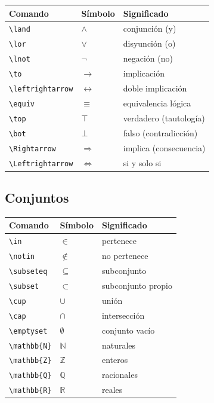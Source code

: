 \begin{center}
\begin{tabular}{lll}
\toprule
\textbf{Comando} & \textbf{Símbolo} & \textbf{Significado} \\
\midrule
\texttt{\textbackslash{}land}  & $\land$ & conjunción (y) \\
\texttt{\textbackslash{}lor}   & $\lor$  & disyunción (o) \\
\texttt{\textbackslash{}lnot}  & $\lnot$ & negación (no) \\
\texttt{\textbackslash{}to}    & $\to$   & implicación \\
\texttt{\textbackslash{}leftrightarrow} & $\leftrightarrow$ & doble implicación \\
\texttt{\textbackslash{}equiv} & $\equiv$ & equivalencia lógica \\
\texttt{\textbackslash{}top}   & $\top$   & verdadero (tautología) \\
\texttt{\textbackslash{}bot}   & $\bot$   & falso (contradicción) \\
\texttt{\textbackslash{}Rightarrow}  & $\Rightarrow$ & implica (consecuencia) \\
\texttt{\textbackslash{}Leftrightarrow} & $\Leftrightarrow$ & si y solo si \\
\bottomrule
\end{tabular}
\end{center}

\subsection{Conjuntos}

\begin{center}
\begin{tabular}{lll}
\toprule
\textbf{Comando} & \textbf{Símbolo} & \textbf{Significado} \\
\midrule
\texttt{\textbackslash{}in}     & $\in$   & pertenece \\
\texttt{\textbackslash{}notin}  & $\notin$ & no pertenece \\
\texttt{\textbackslash{}subseteq} & $\subseteq$ & subconjunto \\
\texttt{\textbackslash{}subset} & $\subset$ & subconjunto propio \\
\texttt{\textbackslash{}cup}    & $\cup$  & unión \\
\texttt{\textbackslash{}cap}    & $\cap$  & intersección \\
\texttt{\textbackslash{}emptyset} & $\emptyset$ & conjunto vacío \\
\texttt{\textbackslash{}mathbb\{N\}} & $\mathbb{N}$ & naturales \\
\texttt{\textbackslash{}mathbb\{Z\}} & $\mathbb{Z}$ & enteros \\
\texttt{\textbackslash{}mathbb\{Q\}} & $\mathbb{Q}$ & racionales \\
\texttt{\textbackslash{}mathbb\{R\}} & $\mathbb{R}$ & reales \\
\bottomrule
\end{tabular}
\end{center}

